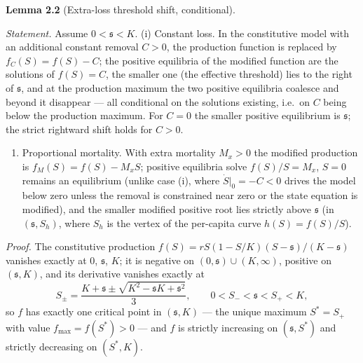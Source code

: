 \documentclass[11pt]{article}
\providecommand{\tightlist}{\setlength{\itemsep}{0pt}\setlength{\parskip}{0pt}}
\begin{document}
\textbf{Lemma 2.2} (Extra-loss threshold shift, conditional).

\emph{Statement.} Assume \(0 < \mathfrak s < K\). (i) Constant loss. In the constitutive model with an
additional constant removal \(C>0\), the production function is replaced
by \(f_C(S)=f(S)-C\); the positive equilibria of the modified function
are the solutions of \(f(S)=C\), the smaller one (the effective
threshold) lies to the right of \(\mathfrak s\), and at the production
maximum the two positive equilibria coalesce and beyond it disappear ---
all conditional on the solutions existing, i.e.~on \(C\) being below the
production maximum. For \(C=0\) the smaller positive equilibrium is \(\mathfrak s\); the strict rightward shift holds for \(C>0\).

\begin{enumerate}
\def\labelenumi{(\roman{enumi})}
\setcounter{enumi}{1}
\tightlist
\item
  Proportional mortality. With extra mortality \(M_x>0\) the modified
  production is \(f_M(S)=f(S)-M_xS\); positive equilibria solve
  \(f(S)/S=M_x\), \(S=0\) remains an equilibrium (unlike case (i), where
  \(\dot S|_0=-C<0\) drives the model below zero unless the removal is
  constrained near zero or the state equation is modified), and the smaller modified positive root lies strictly above \(\mathfrak s\) (in \((\mathfrak s, S_h)\), where \(S_h\) is the vertex of the per-capita curve \(h(S) = f(S)/S\)).
\end{enumerate}

\emph{Proof.} The constitutive production
\(f(S) = rS(1-S/K)(S-\mathfrak s)/(K-\mathfrak s)\) vanishes exactly at
\(0\), \(\mathfrak s\), \(K\); it is negative on
\((0,\mathfrak s)\cup(K,\infty)\), positive on \((\mathfrak s,K)\), and
its derivative vanishes exactly at
\[S_{\pm} = \frac{K+\mathfrak s \pm \sqrt{K^2-\mathfrak s K+\mathfrak s^2}}{3}, \qquad 0 < S_- < \mathfrak s < S_+ < K,\]
so \(f\) has exactly one critical point in \((\mathfrak s,K)\) --- the
unique maximum \(S^* = S_+\) with value \(f_{\max} = f(S^*) > 0\) ---
and \(f\) is strictly increasing on \((\mathfrak s,S^*)\) and strictly
decreasing on \((S^*,K)\).
\end{document}

